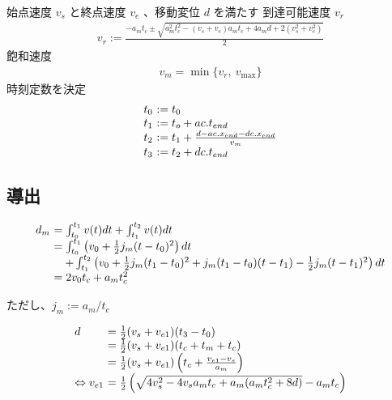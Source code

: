 \documentclass[a5paper]{ltjsarticle}
\begin{document}
始点速度 $v_s$ と終点速度 $v_e$ 、移動変位 $d$ を満たす
到達可能速度 $v_r$
\begin{align}
    v_r := \frac{-a_mt_c \pm \sqrt{a_m^2t_c^2-(v_s+v_e)a_mt_c+4a_md+2(v_s^2+v_e^2)}}{2}
\end{align}
飽和速度
\begin{align}
    v_m = \min\{v_r,~v_{\max} \}
\end{align}
時刻定数を決定
\begin{align}
    \begin{array}{l@{~}l}
        t_0 & := t_0
        \\
        t_1 & := t_o + ac.t_{end}
        \\
        t_2 & := t_1 + \frac{d - ac.x_{end} - dc.x_{end}}{v_m}
        \\
        t_3 & := t_2 + dc.t_{end}
    \end{array}
\end{align}

\subsection{導出}

$$
    \begin{array}{l@{~}l}
        d_m & =                  \int_{t_0}^{t_1}v(t) dt + \int_{t_1}^{t_2}v(t) dt
        \\
            & =                  \int_{t_0}^{t_1}\left( v_0+\frac{1}{2} j_m(t-t_0)^2 \right) dt
        \\
            & \quad+ \int_{t_1}^{t_2}\left(
        v_0+                     \frac{1}{2} j_m(t_1-t_0)^2
        +j_m(t_1-t_0)(t-t_1) -   \frac{1}{2}j_m(t-t_1)^2
        \right) dt
        \\
            & = 2v_0t_c+a_mt_c^2
    \end{array}
$$

ただし、$j_m:=a_m/t_c$

$$
    \begin{array}{l@{~}l}
        d                      & = \frac{1}{2}(v_s+v_{e1})(t_3-t_0)
        \\
                               & = \frac{1}{2}(v_s+v_{e1})(t_c+t_m+t_c)
        \\
                               & = \frac{1}{2}(v_s+v_{e1})\left(t_c+\frac{v_{e1}-v_s}{a_m}\right)
        \\
        \Leftrightarrow v_{e1} & =
        \frac{1}{2}\left(\sqrt{4v_s^2-4v_sa_mt_c+a_m(a_mt_c^2+8d)}-a_mt_c\right)
    \end{array}
$$
\end{document}
